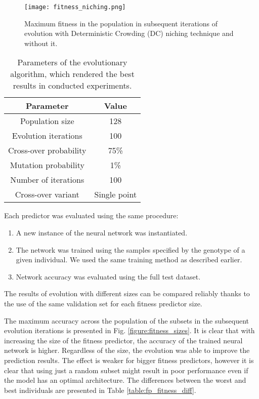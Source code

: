 \documentclass{llncs}
\begin{document}
\begin{figure}[t]
    \centering
    \texttt{[image: fitness\_niching.png]}
    \caption{Maximum fitness in the population in subsequent iterations of evolution with Deterministic Crowding (DC) niching technique and without it.}
    \label{figure:fitness_niching}
\end{figure}

\begin{table}

    \center
    \begin{tabular}{|c|c|}
        \hline
        Parameter & Value \\
        \hline
        Population size & 128 \\
        Evolution iterations & 100 \\
        Cross-over probability & 75\% \\
        Mutation probability & 1\% \\        
        Number of iterations & 100 \\
        Cross-over variant & Single point \\
        \hline
    \end{tabular}

    \caption{Parameters of the evolutionary algorithm, which rendered the best results in conducted experiments.}
    \label{table:evolution_parameters}

\end{table}

Each predictor was evaluated using the same procedure:

\begin{enumerate}

    \item A new instance of the neural network was instantiated.
    \item The network was trained using the samples specified by the genotype of a given individual. We used the same training method as described earlier.
    \item Network accuracy was evaluated using the full test dataset.

\end{enumerate}

The results of evolution with different sizes can be compared reliably thanks to the use of the same validation set for each fitness predictor size.

The maximum accuracy across the population of the subsets in the subsequent evolution iterations is presented in Fig. \ref{figure:fitness_sizes}. It is clear that with increasing the size of the fitness predictor, the accuracy of the trained neural network is higher. Regardless of the size, the evolution was able to improve the prediction results. The effect is weaker for bigger fitness predictors, however it is clear that using just a random subset might result in poor performance even if the model has an optimal architecture. The differences between the worst and best individuals are presented in Table \ref{table:fp_fitness_diff}.
\end{document}
